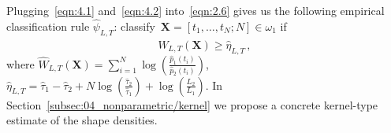 \documentclass[lettersize,journal,onecolumn]{IEEEtran}
\theoremstyle{definition}
\begin{document}
Plugging~\eqref{eqn:4.1} and~\eqref{eqn:4.2} into~\eqref{eqn:2.6} gives us the 
following empirical classification rule \mbox{$\widehat{\psi}_{L,T}$}: 
classify~$\mathbf{X}=\left[t_{1},\ldots,t_{N};N\right]\in\omega_{1}$ if 
\begin{equation}
	\widehat{W}_{L,T}(\mathbf{X})\geq\widehat{\eta}_{L,T}
	\label{eqn:4.3} \,,
\end{equation}
where 
$
\widehat{W}_{L,T}(\mathbf{X})=
\sum_{i=1}^{N}\log\left(
\frac{\widehat{p}_{1}(t_{i})}{\widehat{p}_{2}(t_{i})}
\right)
$,
$
\widehat{\eta}_{L,T}=
\widehat{\tau}_{1}-\widehat{\tau}_{2}+
N\log\left(\frac{\widehat{\tau}_{2}}{\widehat{\tau}_{1}}\right)+
\log\left(\frac{L_{2}}{L_{1}}\right)
$.
In Section~\ref{subsec:04_nonparametric/kernel} we propose a concrete kernel-type 
estimate of the shape densities.
\end{document}
